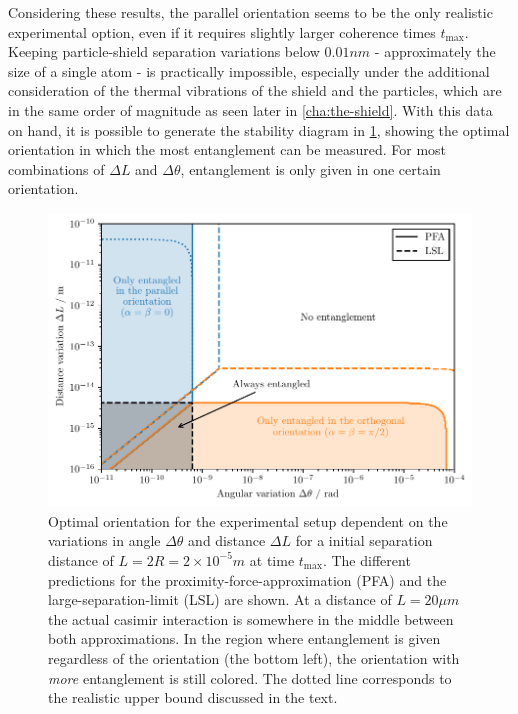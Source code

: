 Considering these results, the parallel orientation seems to be the only realistic experimental option, even if it requires slightly larger coherence times $t_\mathrm{max}$.
Keeping particle-shield separation variations below $0.01\si{nm}$ - approximately the size of a single atom - is practically impossible,  
especially under the additional consideration of the thermal vibrations of the shield and the particles, which are in the same order of magnitude as seen later in \cref{cha:the-shield}.
With this data on hand, it is possible to generate the stability diagram in \cref{fig:4:optimal-orientation}, showing the optimal orientation in which the most entanglement can be measured.
For most combinations of $\Delta L$ and $\Delta \theta$, entanglement is only given in one certain orientation.
\begin{figure}[!htbp]
  \centering
  \includegraphics[width=\textwidth]{./../figures/optimize/optimized-orientation-advanced.pdf}
  \caption{Optimal orientation for the experimental setup dependent on the variations in angle $\Delta\theta$ and distance $\Delta L$ for a initial separation distance of $L=2R=2\times 10^{-5}\si{m}$ at time $t_\mathrm{max}$. The different predictions for the proximity-force-approximation (PFA) and the large-separation-limit (LSL) are shown. At a distance of $L=20\si{\mu m}$ the actual casimir interaction is somewhere in the middle between both approximations. In the region where entanglement is given regardless of the orientation (the bottom left), the orientation with \textit{more} entanglement is still colored. The dotted line corresponds to the realistic upper bound discussed in the text.}
  \label{fig:4:optimal-orientation}
\end{figure}


